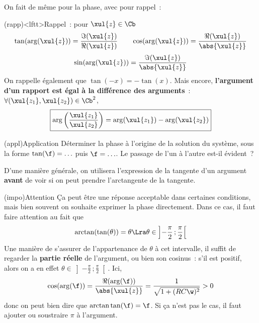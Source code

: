 \documentclass[../../main/main.tex]{subfiles}
\begin{document}
On fait de même pour la phase, avec pour rappel~:
\begin{tcb}[sidebyside](rapp)<lftt>{Rappel~: pour $\xul{z} \in \Cb$}
	\[\tan(\arg(\xul{z})) = \frac{\Im(\xul{z})}{\Re(\xul{z})}
		\qquad
		\cos(\arg(\xul{z})) = \frac{\Re(\xul{z})}{\abs{\xul{z}}}
	\]
	\[
		\qquad
		\sin(\arg(\xul{z})) = \frac{\Im(\xul{z})}{\abs{\xul{z}}}
		\qquad
	\]
	On rappelle également que $\tan(-x) = -\tan(x)$.
	\tcblower
	Mais encore,
	\textbf{l'argument d'un rapport est égal à la différence des arguments}~:
	$\forall (\xul{z_1}, \xul{z_2}) \in \Cb^2$,
	\[
		\boxed{
			\arg\left( \frac{\xul{z_1}}{\xul{z_2}} \right) =
			\arg(\xul{z_1}) - \arg(\xul{z_2})
		}
	\]
\end{tcb}
\begin{tcb}(appl){Application}
	Déterminer la phase à l'origine de la solution du système, sous la forme
	$\tan(\f) = \ldots$ puis $\f = \ldots$. Le passage de l'un à l'autre est-il
	évident~?
	\tcblower
\end{tcb}
D'une manière générale, on utilisera l'expression de la tangente d'un
argument \textbf{avant} de voir si on peut prendre l'arctangente de la
tangente.
\begin{tcb}(impo){Attention}
	Ça peut être une réponse acceptable dans certaines conditions, mais bien souvent
	on souhaite exprimer la phase directement. Dans ce cas, il faut faire attention
	au fait que
	\[
	\arctan(\tan(\theta)) = \theta
	\Lra
	\theta \in \left] - \frac{\pi}{2}\,; \frac{\pi}{2} \right[
		\]
		Une manière de s'assurer de l'appartenance de $\theta$ à cet intervalle, il
		suffit de regarder la \textbf{partie réelle} de l'argument, ou bien son
		cosinus~: s'il est positif, alors on a en effet $\theta \in \left] -
	\frac{\pi}{2}\,; \frac{\pi}{2} \right[$. Ici,
		\begin{gather*}
			\cos(\arg(\f))
			= \frac{\Re(\arg(\f))}{\abs{\xul{z}}}
			= \frac{1}{\sqrt{1 + (RC\w)^2}} > 0
		\end{gather*}
		donc on peut bien dire que $\arctan\tan(\f) = \f$.
		\smallbreak
		Si ça n'est pas le cas, il faut ajouter ou soustraire $\pi$ à l'argument.
\end{tcb}
\end{document}

